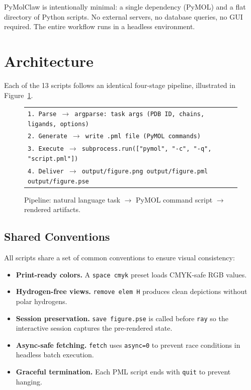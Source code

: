 \documentclass[12pt,a4paper]{article}
\begin{document}
PyMolClaw is intentionally minimal: a single dependency (PyMOL) and a flat directory of Python scripts. No external servers, no database queries, no GUI required. The entire workflow runs in a headless environment.

\section{Architecture}

Each of the 13 scripts follows an identical four-stage pipeline, illustrated in Figure~\ref{fig:pipeline}.

\begin{figure}[htbp]
\centering
\small
\begin{tabular}{|p{}}\\
\hline
\texttt{1. Parse  $\rightarrow$  argparse: task args (PDB ID, chains, ligands, options)}\\
\texttt{2. Generate $\rightarrow$ write .pml file (PyMOL commands)}\\
\texttt{3. Execute  $\rightarrow$  subprocess.run(["pymol", "-c", "-q", "script.pml"])}\\
\texttt{4. Deliver  $\rightarrow$  output/figure.png  output/figure.pml  output/figure.pse}\\
\hline
\end{tabular}
\caption{Pipeline: natural language task $\rightarrow$ PyMOL command script $\rightarrow$ rendered artifacts.}
\label{fig:pipeline}
\end{figure}

\subsection{Shared Conventions}

All scripts share a set of common conventions to ensure visual consistency:

\begin{itemize}
  \item \textbf{Print-ready colors.} A \texttt{space cmyk} preset loads CMYK-safe RGB values.
  \item \textbf{Hydrogen-free views.} \texttt{remove elem H} produces clean depictions without polar hydrogens.
  \item \textbf{Session preservation.} \texttt{save figure.pse} is called before \texttt{ray} so the interactive session captures the pre-rendered state.
  \item \textbf{Async-safe fetching.} \texttt{fetch} uses \texttt{async=0} to prevent race conditions in headless batch execution.
  \item \textbf{Graceful termination.} Each PML script ends with \texttt{quit} to prevent hanging.
\end{itemize}
\end{document}
